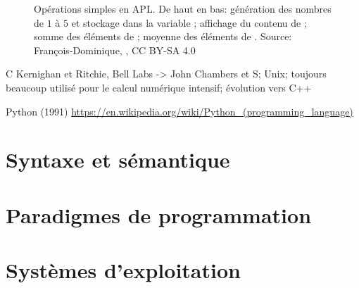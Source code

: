 \begin{figure}
  \centering
  \caption[Opérations simples en APL.]{Opérations simples en APL. De
    haut en bas: génération des nombres de $1$ à $5$ et stockage dans
    la variable ; affichage du contenu de ; somme des
    éléments de ; moyenne des éléments de . {\small Source:
    François-Dominique,
    , CC BY-SA 4.0}}
  \label{fig:informatique:apl}
\end{figure}


C Kernighan et Ritchie, Bell Labs -> John Chambers et S; Unix;
toujours beaucoup utilisé pour le calcul numérique intensif; évolution
vers C++

Python (1991)
\url{https://en.wikipedia.org/wiki/Python_(programming_language)}






\section{Syntaxe et sémantique}
\label{sec:informatique:syntaxe}

\section{Paradigmes de programmation}
\label{sec:informatique:paradigmes}

\section{Systèmes d'exploitation}
\label{sec:informatique:os}



